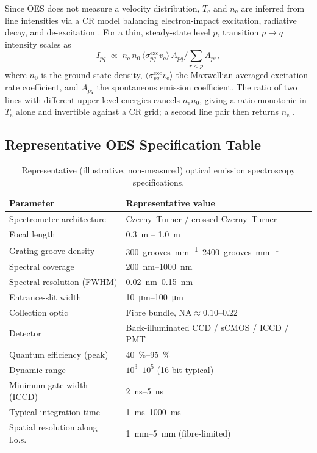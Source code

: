 Since OES does not measure a velocity distribution, $T_{\mathrm{e}}$ and $n_{\mathrm{e}}$ are inferred from line intensities via a CR model balancing electron-impact excitation, radiative decay, and de-excitation \cite{ref0237,ref0245}. For a thin, steady-state level $p$, transition $p \to q$ intensity scales as
\begin{equation}
I_{pq} \; \propto \; n_{\mathrm{e}} \, n_{0} \, \langle \sigma_{pq}^{\mathrm{exc}} v_{\mathrm{e}} \rangle \, A_{pq} \Big/ \sum_{r<p} A_{pr} ,
\label{eq:specs-crmodel}
\end{equation}
where $n_{0}$ is the ground-state density, $\langle \sigma_{pq}^{\mathrm{exc}} v_{\mathrm{e}} \rangle$ the Maxwellian-averaged excitation rate coefficient, and $A_{pq}$ the spontaneous emission coefficient. The ratio of two lines with different upper-level energies cancels $n_{\mathrm{e}} n_{0}$, giving a ratio monotonic in $T_{\mathrm{e}}$ alone and invertible against a CR grid; a second line pair then returns $n_{\mathrm{e}}$ \cite{ref0231}.

\subsection{Representative OES Specification Table}

\begin{table}[htbp]
\centering
\caption{Representative (illustrative, non-measured) optical emission spectroscopy specifications.}
\label{tab:oes-specs}
\begin{tabular}{@{}ll@{}}
\toprule
Parameter & Representative value \\
\midrule
Spectrometer architecture & Czerny--Turner / crossed Czerny--Turner \\
Focal length & \SI{0.3}{\meter} -- \SI{1.0}{\meter} \\
Grating groove density & \SIrange{300}{2400}{grooves\per\milli\meter} \\
Spectral coverage & \SIrange{200}{1000}{\nano\meter} \\
Spectral resolution (FWHM) & \SIrange{0.02}{0.15}{\nano\meter} \\
Entrance-slit width & \SIrange{10}{100}{\micro\meter} \\
Collection optic & Fibre bundle, $\mathrm{NA} \approx 0.10$--$0.22$ \\
Detector & Back-illuminated CCD / sCMOS / ICCD / PMT \\
Quantum efficiency (peak) & \SIrange{40}{95}{\percent} \\
Dynamic range & $10^{3}$--$10^{5}$ (16-bit typical) \\
Minimum gate width (ICCD) & \SIrange{2}{5}{\nano\second} \\
Typical integration time & \SIrange{1}{1000}{\milli\second} \\
Spatial resolution along l.o.s. & \SIrange{1}{5}{\milli\meter} (fibre-limited) \\
\bottomrule
\end{tabular}
\end{table}

